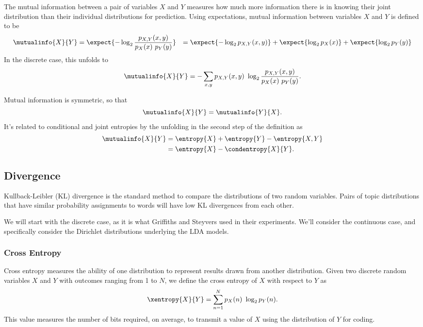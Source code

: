 The mutual information between a pair of variables $X$ and $Y$ measures how
much more information there is in knowing their joint distribution than their
individual distributions for prediction.  Using expectations, mutual information
between variables $X$ and $Y$ is defined to be
%
\begin{align}
\mutualinfo{X}{Y} 
&= \expect{-\log_2 \frac{p_{X,Y}(x,y)}{p_X(x) \ p_Y(y)}}
&= \expect{-\log_2 p_{X,Y}(x,y)} + \expect{\log_2 p_X(x)} + \expect{\log_2 p_Y(y)}
\end{align}
%
In the discrete case, this unfolds to
%
\begin{equation}
\mutualinfo{X}{Y} = - \sum_{x,y} p_{X,Y}(x,y) \ \log_2 \frac{p_{X,Y}(x,y)}{p_X(x) \ p_Y(y)}.
\end{equation}
%

Mutual information is symmetric, so that
%
\begin{equation}
\mutualinfo{X}{Y} = \mutualinfo{Y}{X}.
\end{equation}
%
It's related to conditional and joint entropies by the unfolding
in the second step of the definition as 
%
\begin{align}
\mutualinfo{X}{Y} &= \entropy{X} + \entropy{Y} - \entropy{X,Y}
\\
&= \entropy{X} - \condentropy{X}{Y}.
\end{align}
%


\subsection{Divergence}\label{section:stats-divergence}

Kullback-Leibler (KL) divergence is the standard method to compare the
distributions of two random variables.  Pairs of topic distributions
that have similar probability assignments to words will have low KL
divergences from each other.

We will start with the discrete case, as it is what Griffiths and
Steyvers used in their experiments.  We'll consider the continuous
case, and specifically consider the Dirichlet distributions underlying
the LDA models.

\subsubsection{Cross Entropy}\label{section:stats-cross-entropy}

Cross entropy measures the ability of one distribution to represent
results drawn from another distribution.  Given two discrete random
variables $X$ and $Y$ with outcomes ranging from 1 to $N$, we define
the cross entropy of $X$ with respect to $Y$ as
%
\begin{equation}
\xentropy{X}{Y} = \sum_{n=1}^N p_X(n) \ \log_2 p_Y(n).
\end{equation}
%
This value measures the number of bits required, on average, to
transmit a value of $X$ using the distribution of $Y$ for coding.


